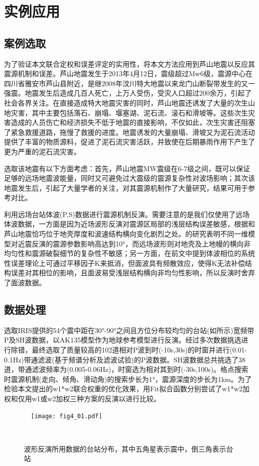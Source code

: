 

\chapter{实例应用}

\section{案例选取}

为了验证本文联合定权和误差评定的实用性，将本文方法应用到芦山地震以反应其震源机制和误差。芦山地震发生于2013年4月12日，震级超过Mw6级，震源中心在四川省雅安市芦山县附近，是继2008年汶川特大地震以来龙门山断裂带发生的又一强震。地震发生后造成几百人死亡，上万人受伤，受灾人口超过200余万，引起了社会各界关注。在直接造成特大地震灾害的同时，芦山地震还诱发了大量的次生山地灾害，其中主要包括落石、崩塌、堰塞湖、泥石流、滚石和滑坡等。这些次生灾害造成的人员伤亡和经济损失不低于地震的直接影响，不仅如此，次生灾害还阻塞了紧急救援道路，拖慢了救援的进度。地震诱发的大量崩塌、滑坡又为泥石流活动提供了丰富的物质源料，促进了泥石流灾害活跃，并致使在后期暴雨作用下产生了更为严重的泥石流灾害。

选取该地震有以下方面考虑：首先，芦山地震MW震级在6-7级之间，既可以保证足够的远场地震波能量，同时又可避免过大震级的震源复杂性对波场影响；其次该地震发生后，引起了大量学者的关注，对其震源机制作了大量研究，结果可用于参考对比。

利用远场台站体波(P,S)数据进行震源机制反演。需要注意的是我们仅使用了远场体波数据，一方面是因为近场波形反演对震源区局部的浅层结构误差敏感，根据和 芦山地震恰巧位于地壳厚度和波速结构横向变化剧烈之处。的研究表明不同一维模型对近震反演的震源参数影响高达到10°，而远场波形则对地壳及上地幔的横向非均匀性和震源破裂细节的复杂性不敏感；另一方面，在前文中提到体波相位的系统性误差理论上可通过平移因子K来抵消，但面波具有频散效应，使得K无法补偿结构误差对其相位的影响，且面波易受浅层结构横向非均匀性影响，所以反演时舍弃了面波数据。

\section{数据处理}

选取IRIS提供的54个震中距在30°-90°之间且方位分布较均匀的台站(如所示)宽频带P及SH波数据，以AK135模型\citep{Kennett1995}作为地球参考模型进行反演。经过多次数据挑选进行除错，最终选取了质量较高的102道相对P波到时(-10s,30s)的时窗并进行(0.01-0.1Hz)带通滤波(基于频谱分析及滤波试验)的P波数据。SH波数据总共挑选了38道，带通滤波频率为(0.005-0.06Hz)，时窗选为相对其到时(-30s,100s)。格点搜索时震源机制(走向、倾角、滑动角)的搜索步长为1°，震源深度的步长为1km。为了检验本文提出的w1*w2联合权重的优化效果，用Fit拟合函数分别尝试了w1*w2加权和仅用w1或w2加权三种方案的反演以进行比较。
\begin{figure}
\centering
  \texttt{[image: fig4\_01.pdf]}
  \caption{波形反演所用数据的台站分布，其中五角星表示震中，倒三角表示台站}
  \label{fig4_01}
\end{figure}

